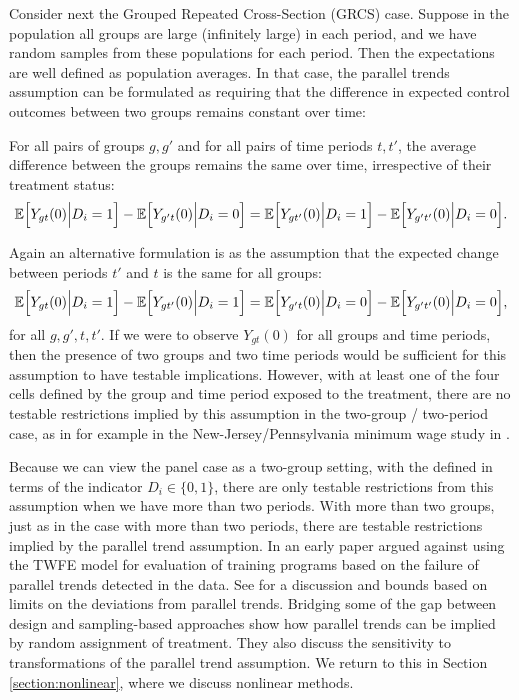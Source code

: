 \documentclass[letterpaper,12pt,leqno]{article}
\newcommand{\mme}{{\mathbb{E}}}
\begin{document}
Consider next the Grouped Repeated Cross-Section (GRCS) case. Suppose in the population all groups are large (infinitely large) in each period, and we have random samples from these populations for each period. Then the expectations are well defined as population averages.  In that case, the parallel trends assumption can be formulated as requiring that the difference in expected control outcomes between two groups remains constant over time:
\begin{assumption}
For all pairs of groups $g,g'$ and for all pairs of time periods $t,t'$, the average difference between the groups remains the same over time, irrespective of their treatment status:
\begin{equation}
\mme\Bigl[Y_{gt}(0)\Bigl| D_i=1\Bigr] - \mme\Bigl[Y_{g't}(0)\Bigl| D_i=0\Bigr] = \mme\Bigl[Y_{gt'}(0)\Bigl| D_i=1\Bigr] - \mme\Bigl[Y_{g't^{\prime}}(0)\Bigl| D_i=0\Bigr]. 
\end{equation}
\end{assumption}
Again an alternative formulation is as the assumption that the expected change between periods $t'$ and $t$ is the same for all groups:
\[
\mme\Bigl[Y_{gt}(0)\Bigl| D_i=1\Bigr] -  \mme\Bigl[Y_{gt^{\prime}}(0)\Bigl| D_i=1\Bigr] = \mme\Bigl[Y_{g't}(0)\Bigl| D_i=0\Bigr] -\mme\Bigl[Y_{g't'}(0)\Bigl| D_i=0\Bigr],
\]
 for all $ g,g',t,t'$.
If we were to observe $Y_{gt}(0)$ for all groups and time periods, then the presence of two groups and two time periods would be sufficient for this assumption to have testable implications. However, with at least one of the four cells defined by the group and time period exposed to the treatment, there are no testable restrictions implied by this assumption in the two-group / two-period case, as in for example in the New-Jersey/Pennsylvania minimum wage study in \citep{card1994minimum}.


Because we can view the panel case as a two-group setting, with the defined in terms of the indicator $D_i\in\{0,1\}$, there are only testable restrictions from this assumption when we have more than two periods. With more than two groups, just as in the case with more than two periods, there are testable restrictions implied by the parallel trend assumption. In an early paper \citep*{ashenfelter1985using} argued against using the TWFE model for evaluation of training programs based on the failure of parallel trends detected in the data. See \citep*{roth2023s,rambachan2023more, jakiela2021simple} for a discussion and bounds based on limits on the deviations from parallel trends.
Bridging some of the gap between design and sampling-based approaches
 \citep{roth2023parallel} show how parallel trends can be implied by random assignment of treatment. They also discuss the sensitivity to transformations of the parallel trend assumption. We return to this in Section \ref{section:nonlinear}, where we discuss nonlinear methods.
\end{document}
